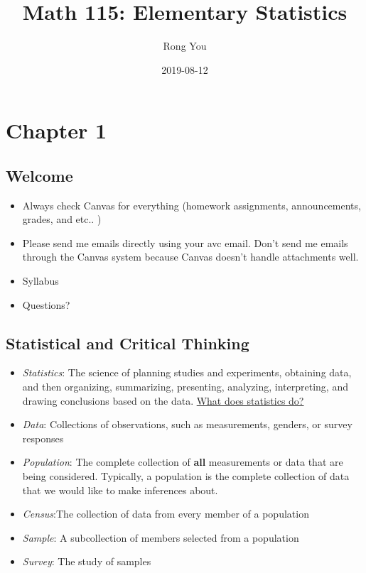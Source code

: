 \documentclass[]{book}
\title{Math 115: Elementary Statistics}
\author{Rong You}
\date{2019-08-12}
\providecommand{\tightlist}{%
  \setlength{\itemsep}{0pt}\setlength{\parskip}{0pt}}
\begin{document}
\maketitle

{
\setcounter{tocdepth}{1}
\tableofcontents
}
\hypertarget{chapter-1}{%
\chapter{Chapter 1}\label{chapter-1}}

\hypertarget{welcome}{%
\section{Welcome}\label{welcome}}

\begin{itemize}
\tightlist
\item
  Always check Canvas for everything (homework assignments, announcements, grades, and etc.. )
\item
  Please send me emails directly using your avc email. Don't send me emails through the Canvas system because Canvas doesn't handle attachments well.
\item
  Syllabus
\item
  Questions?
\end{itemize}

\hypertarget{statistical-and-critical-thinking}{%
\section{Statistical and Critical Thinking}\label{statistical-and-critical-thinking}}

\begin{itemize}
\tightlist
\item
  \emph{Statistics}: The science of planning studies and experiments, obtaining data, and then organizing, summarizing, presenting, analyzing, interpreting, and drawing conclusions based on the data. \href{https://www.youtube.com/watch?v=nTBZuQR7dRc}{What does statistics do?}
\item
  \emph{Data}: Collections of observations, such as measurements, genders, or survey responses
\item
  \emph{Population}: The complete collection of \textbf{all} measurements or data that are being considered. Typically, a population is the complete collection of data that we would like to make inferences about.
\item
  \emph{Census}:The collection of data from every member of a population
\item
  \emph{Sample}: A subcollection of members selected from a population
\item
  \emph{Survey}: The study of samples
\end{itemize}
\end{document}
